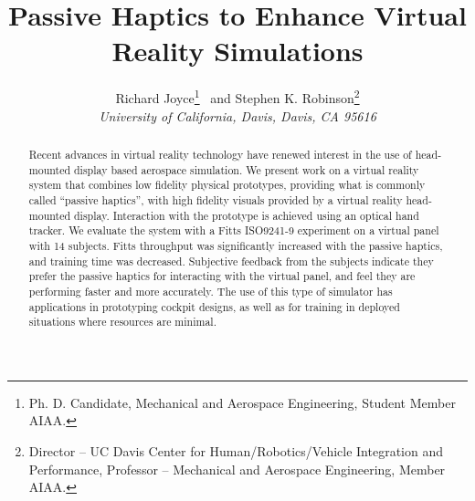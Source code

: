 \documentclass[]{aiaa-tc}%
\title{Passive Haptics to Enhance Virtual Reality Simulations}
\author{Richard Joyce\thanks{Ph. D. Candidate, Mechanical and Aerospace Engineering, Student Member AIAA.}
  \ and Stephen K. Robinson\thanks{Director – UC Davis Center for Human/Robotics/Vehicle Integration and Performance, Professor – Mechanical and Aerospace Engineering, Member AIAA.}\\
  {\normalsize\itshape University of California, Davis, Davis, CA 95616}\\
 }
\begin{document}
\maketitle

\begin{abstract}
Recent advances in virtual reality technology have renewed interest in the use of head-mounted display based aerospace simulation.
We present work on a virtual reality system that combines low fidelity physical prototypes, providing what is commonly called ``passive haptics'', with high fidelity visuals provided by a virtual reality head-mounted display.
Interaction with the prototype is achieved using an optical hand tracker.
We evaluate the system with a Fitts ISO9241-9 experiment on a virtual panel with 14 subjects.
Fitts throughput was significantly increased with the passive haptics, and training time was decreased.
Subjective feedback from the subjects indicate they prefer the passive haptics for interacting with the virtual panel, and feel they are performing faster and more accurately.
The use of this type of simulator has applications in prototyping cockpit designs, as well as for training in deployed situations where resources are minimal.
\end{abstract}
\end{document}
